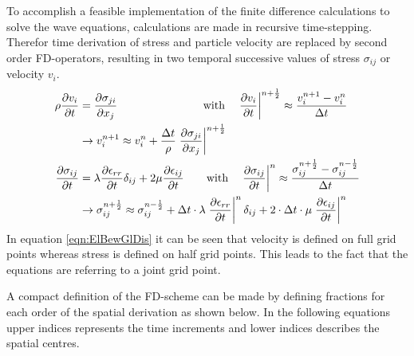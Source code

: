 \documentclass[pdftex,a4paper,parskip,listof=totoc,bibliography=totoc,onehalfspacing,12pt]{scrreprt}
\begin{document}
To accomplish a feasible implementation of the finite difference calculations to solve the wave equations, calculations are made in recursive time-stepping. Therefor time derivation of stress and particle velocity are replaced by second order FD-operators, resulting in two temporal successive values of stress $\sigma_{ij}$ or velocity $v_i$.
\begin{align}
	\rho \frac{\partial v_i}{\partial t} &= \frac{\partial \sigma_{ji}}{\partial x_j} \qquad \qquad \qquad \quad \,\,\,\, \text{with} \quad \left.\frac{\partial v_i}{\partial t}\right\rvert^{n+\frac{1}{2}} \approx \frac{v_i^{n+1} - v_i^{n}}{\Delta t}\notag\\
	&\rightarrow v_i^{n+1} \approx v_i^n + \frac{\Delta t}{\rho}  \left.\frac{\partial \sigma_{ji}}{\partial x_j}\right\rvert^{n+\frac{1}{2}}\label{eqn:ElBewGlDis}\\
	\frac{\partial \sigma_{ij}}{\partial t} &= \lambda \frac{\partial \epsilon_{rr}}{\partial t} \delta_{ij} + 2 \mu \frac{\partial \epsilon_{ij}}{\partial t} \qquad \text{with} \quad \left.\frac{\partial \sigma_{ij}}{\partial t}\right\rvert^n \approx \frac{\sigma_{ij}^{n+\frac{1}{2}} - \sigma_{ij}^{n-\frac{1}{2}}}{\Delta t}\notag\\
	&\rightarrow \sigma_{ij}^{n+\frac{1}{2}} \approx \sigma_{ij}^{n-\frac{1}{2}} + \Delta t \cdot \lambda \left.\frac{\partial \epsilon_{rr}}{\partial t}\right\rvert^n \delta_{ij} + 2 \cdot \Delta t \cdot \mu \left. \frac{\partial \epsilon_{ij}}{\partial t}\right\rvert^n
\end{align}
In equation \ref{eqn:ElBewGlDis} it can be seen that velocity is defined on full grid points whereas stress is defined on half grid points. This leads to the fact that the equations are referring to a joint grid point. 

A compact definition of the FD-scheme can be made by defining fractions for each order of the spatial derivation as shown below. 
In the following equations upper indices represents the time increments and lower indices describes the spatial centres. 
\end{document}
